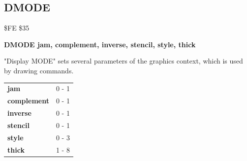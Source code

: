 \subsection{DMODE}
\begin{description}[leftmargin=2cm,style=nextline]
\item [Token:] \$FE \$35
\item [Format:] {\bf DMODE jam, complement, inverse, stencil, style, thick}
\item [Usage:]
   "Display MODE" sets several parameters of the graphics context, which is used by drawing commands.

\begin{center}
\ttfamily
\begin{tabular}{|l|l|}
\hline
   {\bf jam}        &  0 - 1 \\
   {\bf complement} &  0 - 1 \\
   {\bf inverse}    &  0 - 1 \\
   {\bf stencil}    &  0 - 1 \\
   {\bf style}      &  0 - 3 \\
   {\bf thick}      &  1 - 8 \\
\hline
\end{tabular}
\end{center}
\end{description}


\newpage
